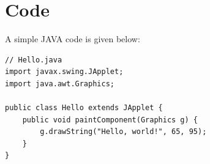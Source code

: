 \section{Code}

A simple JAVA code is given below:

\lstset{frame=tb,language=Java} %
\begin{lstlisting}
// Hello.java
import javax.swing.JApplet;
import java.awt.Graphics;

public class Hello extends JApplet {
    public void paintComponent(Graphics g) {
        g.drawString("Hello, world!", 65, 95);
    }    
}
\end{lstlisting}




